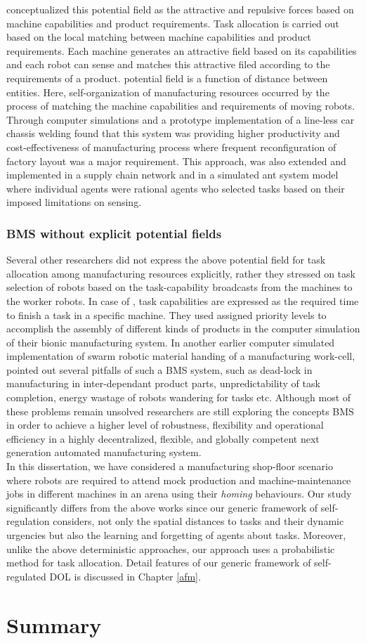 conceptualized this potential field as the attractive and repulsive forces based on machine capabilities and product requirements. Task allocation is carried out based on the local matching between machine capabilities and product requirements. Each machine generates an attractive field based on its capabilities and each robot can sense and matches this attractive filed according to the requirements of a product. potential field is a function of distance between entities. Here, self-organization of manufacturing resources occurred by the process of matching the machine capabilities and requirements of moving robots. Through computer simulations and a prototype implementation of a line-less car chassis welding \cite{Ueda2006} found that this system was providing higher productivity and cost-effectiveness of manufacturing process where frequent reconfiguration of factory layout was a major requirement. This approach, was also extended and implemented in a supply chain network and in a simulated ant system model where individual agents were rational agents who selected tasks based on their imposed limitations on sensing.
\subsubsection*{BMS without explicit potential fields}
Several other researchers did not express the above potential field for task allocation among manufacturing resources explicitly, rather they stressed on task selection of robots based on the task-capability broadcasts from the machines to the worker robots. In case of \cite{Lazinica+2007}, task capabilities are expressed as the required time to finish a task in a specific machine. They used assigned priority levels to accomplish the assembly of different kinds of products in the computer simulation of their bionic manufacturing system. In another earlier computer simulated implementation of swarm robotic material handing of a manufacturing work-cell, \cite{Doty+1993} pointed out several pitfalls of such a BMS system, such as dead-lock in manufacturing in inter-dependant product parts, unpredictability of task completion, energy wastage of robots wandering for tasks etc. Although most of these problems remain unsolved researchers are still exploring the concepts BMS in order to achieve a higher level of robustness, flexibility and operational efficiency in a highly decentralized, flexible, and globally competent next generation automated manufacturing system.\\
In this dissertation, we have considered a manufacturing shop-floor scenario where robots are required to attend mock production and machine-maintenance jobs in different machines in an arena using their {\em homing} behaviours. Our study significantly differs from the above works since our generic framework of self-regulation considers, not only the spatial distances to tasks and their dynamic urgencies but also the learning and forgetting of agents about tasks. Moreover, unlike the above deterministic approaches, our approach uses a probabilistic method for task allocation. Detail features of our generic framework of self-regulated DOL is discussed in Chapter \ref{afm}.
\section{Summary} 